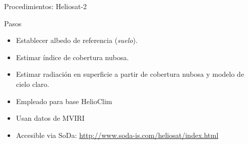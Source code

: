 \documentclass[xcolor={usenames,svgnames,dvipsnames}]{beamer}
\begin{document}
\begin{frame}[label=sec-3-3]{Procedimientos: Heliosat-2}
\begin{block}{Pasos}
\begin{itemize}
\item Establecer \alert{albedo de referencia} (\emph{suelo}).
\item Estimar \alert{índice de cobertura nubosa}.
\item Estimar radiación en superficie a partir de cobertura nubosa y \alert{modelo de cielo claro}.
\end{itemize}
\end{block}
\begin{block}{}
\begin{itemize}
\item Empleado para base HelioClim
\item Usan datos de MVIRI
\item Accesible via SoDa: \url{http://www.soda-is.com/heliosat/index.html}
\end{itemize}

\nocite{Rigollier.Lefevre.ea2004}
\end{block}
\end{frame}
\end{document}
